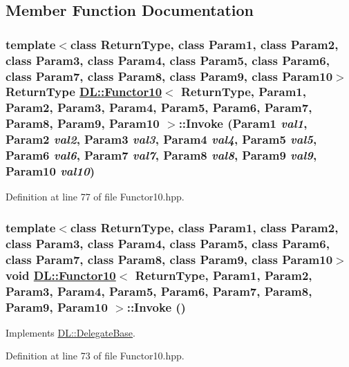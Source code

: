 \subsection{Member Function Documentation}
\hypertarget{classDL_1_1Functor10_a3}{
\subsubsection[Invoke]{\setlength{\rightskip}{0pt plus 5cm}template$<$class Return\-Type, class Param1, class Param2, class Param3, class Param4, class Param5, class Param6, class Param7, class Param8, class Param9, class Param10$>$ Return\-Type \hyperlink{classDL_1_1Functor10}{DL::Functor10}$<$ Return\-Type, Param1, Param2, Param3, Param4, Param5, Param6, Param7, Param8, Param9, Param10 $>$::Invoke (Param1 {\em val1}, Param2 {\em val2}, Param3 {\em val3}, Param4 {\em val4}, Param5 {\em val5}, Param6 {\em val6}, Param7 {\em val7}, Param8 {\em val8}, Param9 {\em val9}, Param10 {\em val10})}}
\label{classDL_1_1Functor10_a3}




Definition at line 77 of file Functor10.hpp.\hypertarget{classDL_1_1Functor10_a2}{
\subsubsection[Invoke]{\setlength{\rightskip}{0pt plus 5cm}template$<$class Return\-Type, class Param1, class Param2, class Param3, class Param4, class Param5, class Param6, class Param7, class Param8, class Param9, class Param10$>$ void \hyperlink{classDL_1_1Functor10}{DL::Functor10}$<$ Return\-Type, Param1, Param2, Param3, Param4, Param5, Param6, Param7, Param8, Param9, Param10 $>$::Invoke ()}}
\label{classDL_1_1Functor10_a2}




Implements \hyperlink{classDL_1_1DelegateBase_a2}{DL::Delegate\-Base}.

Definition at line 73 of file Functor10.hpp.

